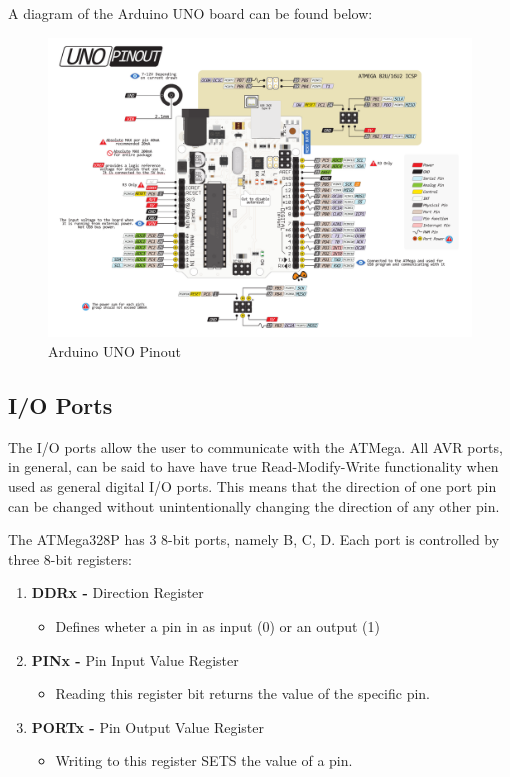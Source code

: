 \clearpage

A diagram of the Arduino UNO board can be found below:

\begin{figure}[H]
    \centering
    \includegraphics[scale = 0.50]{Graphics/MICROS/Practice 1/ARDUINO/BOARD.pdf}
    \caption{Arduino UNO Pinout~\autocite{BQ_ARDUINO}}
    \label{fig:ARDUINO_UNO_BOARD}
\end{figure}

\subsection{I/O Ports}

The I/O ports allow the user to communicate with the ATMega. All AVR ports, in general, can be said to have have true Read-Modify-Write functionality when used as general digital I/O ports. This means that the direction of one port pin can be changed without unintentionally changing the direction of any other pin.\medskip

The ATMega328P has 3 8-bit ports, namely B, C, D. Each port is controlled by three 8-bit registers:

\begin{enumerate}
    \item \textbf{DDRx -} Direction Register
        \begin{itemize}
            \item Defines wheter a pin in as input (0) or an output (1)
        \end{itemize}
    \item \textbf{PINx -} Pin Input Value Register
        \begin{itemize}
            \item Reading this register bit returns the value of the specific pin.
        \end{itemize}
    \item \textbf{PORTx - } Pin Output Value Register
        \begin{itemize}
            \item Writing to this register SETS the value of a pin.
        \end{itemize}
\end{enumerate}

